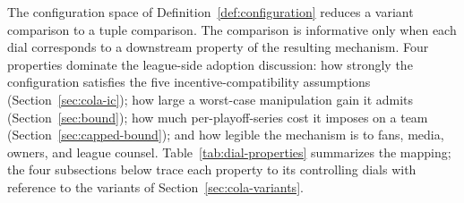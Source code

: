 The configuration space of Definition~\ref{def:configuration} reduces a variant comparison to a tuple comparison. The comparison is informative only when each dial corresponds to a downstream property of the resulting mechanism. Four properties dominate the league-side adoption discussion: how strongly the configuration satisfies the five incentive-compatibility assumptions (Section~\ref{sec:cola-ic}); how large a worst-case manipulation gain it admits (Section~\ref{sec:bound}); how much per-playoff-series cost it imposes on a team (Section~\ref{sec:capped-bound}); and how legible the mechanism is to fans, media, owners, and league counsel. Table~\ref{tab:dial-properties} summarizes the mapping; the four subsections below trace each property to its controlling dials with reference to the variants of Section~\ref{sec:cola-variants}.

